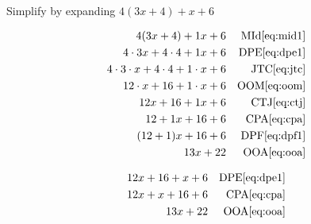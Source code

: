 \begin{example}[id:20141109-094928] \label{20141109-094928}  \hfill \\

Simplify by expanding $4(3x+4)+x+6$

\soln

\solnsteps
\begin{align*}
4(3x+4)+1x+6 && \text{MId} \eqref{eq:mid1} \\
4 \cdot 3x + 4 \cdot 4 + 1x + 6 && \text{DPE} \eqref{eq:dpe1} \\
4 \cdot 3 \cdot x + 4 \cdot 4 + 1 \cdot x + 6 && \text{JTC} \eqref{eq:jtc} \\
12 \cdot x + 16 + 1 \cdot x + 6 && \text{OOM} \eqref{eq:oom} \\
12x+16+1x+6 && \text{CTJ} \eqref{eq:ctj} \\
12+1x+16+6 && \text{CPA} \eqref{eq:cpa} \\
(12+1)x+16+6 && \text{DPF} \eqref{eq:dpf1} \\ 
13x+22 && \text{OOA} \eqref{eq:ooa} 
\end{align*}

\soln

\lesssteps
\begin{align*}
12x + 16 + x+ 6 && \text{DPE} \eqref{eq:dpe1} \\
12x + x + 16 + 6 && \text{CPA} \eqref{eq:cpa} \\
13x+22 && \text{OOA} \eqref{eq:ooa} 
\end{align*}

\end{example}

